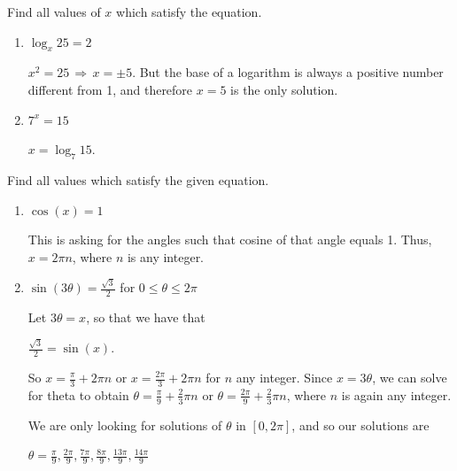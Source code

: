 \documentclass[nooutcomes]{ximera}
\begin{document}
	
	
\begin{problem}
Find all values of $x$ which satisfy the equation.
	
			\begin{enumerate}
			
			\item  $\log_x 25=2$ 
			
			 \begin{freeResponse}			 
			 $x^2 = 25 \, \Longrightarrow \, x = \pm 5$.  But the base of a logarithm is always a positive number different from 1, and therefore $x = 5$ is the only solution. 
			 \end{freeResponse}
			
			\item  $7^x=15$ 
			
			 \begin{freeResponse}			 
			 $x = \log_{7} 15$. 
			 \end{freeResponse}
			
			\end{enumerate}
			
\end{problem}
			
			

\begin{problem}
Find all values which satisfy the given equation.
	
			\begin{enumerate}
			
			\item  $\cos (x)=1$ 
			
			 \begin{freeResponse}			 
			 This is asking for the angles such that cosine of that angle equals 1.  Thus, $x = 2 \pi n$, where $n$ is any integer.  
			 \end{freeResponse}
			
			\item  $\sin (3 \theta )=\frac{\sqrt{3}}{2}$ for $0 \leq \theta \leq 2\pi $
			
			 \begin{freeResponse}			 
			 Let $3 \theta = x$, so that we have that 
			
			$ \frac{\sqrt{3}}{2} = \sin(x) $.
			
			So $ x= \frac{\pi}{3} + 2 \pi n$ or $ x = \frac{2 \pi }{3} + 2 \pi n $ for $n$ any integer.  Since $x = 3 \theta$, we can solve for theta to obtain $ \theta = \frac{\pi}{9} + \frac{2}{3} \pi n $ or $ \theta = \frac{2 \pi }{9} + \frac{2}{3} \pi n $, where $n$ is again any integer.  
			
We are only looking for solutions of $\theta$ in $[0, 2 \pi ]$, and so our solutions are

$ \theta = \frac{\pi}{9}, \frac{2\pi}{9}, \frac{7\pi}{9}, \frac{8\pi}{9}, \frac{13\pi}{9}, \frac{14\pi}{9} $ 
			 \end{freeResponse}
			
			\end{enumerate}
			
\end{problem}
			
\end{document}
